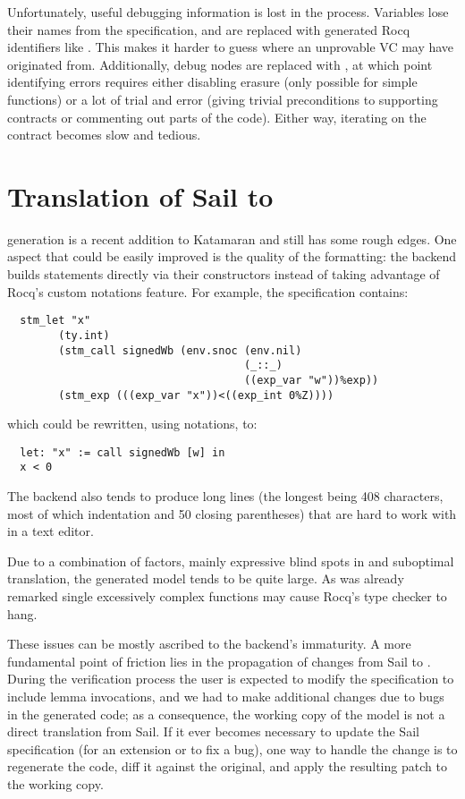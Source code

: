 Unfortunately, useful debugging information is lost in the process. Variables lose their names from the \usail specification, and are replaced with generated Rocq identifiers like . This makes it harder to guess where an unprovable VC may have originated from. Additionally, debug nodes are replaced with , at which point identifying errors requires either disabling erasure (only possible for simple functions) or a lot of trial and error (\eg giving trivial preconditions to supporting contracts or commenting out parts of the code). Either way, iterating on the contract becomes slow and tedious.

\section{Translation of Sail to \usail}

\usail generation is a recent addition to Katamaran and still has some rough edges. One aspect that could be easily improved is the quality of the formatting: the backend builds \usail statements directly via their constructors instead of taking advantage of Rocq's custom notations feature. For example, the \msp \usail specification contains:
\begin{verbatim}
  stm_let "x"
        (ty.int)
        (stm_call signedWb (env.snoc (env.nil)
                                     (_::_)
                                     ((exp_var "w"))%exp))
        (stm_exp (((exp_var "x"))<((exp_int 0%Z))))
\end{verbatim}
which could be rewritten, using notations, to:
\begin{verbatim}
  let: "x" := call signedWb [w] in
  x < 0
\end{verbatim}

The backend also tends to produce long lines (the longest being 408 characters, most of which indentation and 50 closing parentheses) that are hard to work with in a text editor.

Due to a combination of factors, mainly expressive blind spots in \usail and suboptimal translation, the generated model tends to be quite large. As was already remarked single excessively complex functions may cause Rocq's type checker to hang.

These issues can be mostly ascribed to the backend's immaturity. A more fundamental point of friction lies in the propagation of changes from Sail to \usail. During the verification process the user is expected to modify the \usail specification to include lemma invocations, and we had to make additional changes due to bugs in the generated code; as a consequence, the working copy of the \usail model is not a direct translation from Sail. If it ever becomes necessary to update the Sail specification (\eg for an extension or to fix a bug), one way to handle the change is to regenerate the \usail code, diff it against the original, and apply the resulting patch to the working copy.

